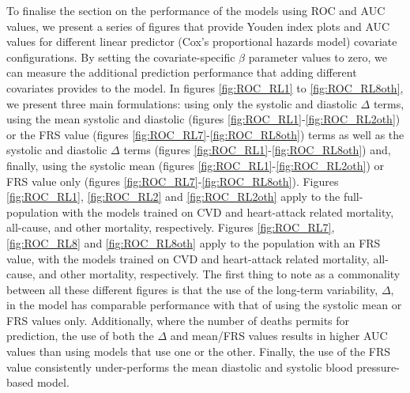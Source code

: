 \documentclass[
]{article}
\begin{document}
To finalise the section on the performance of the models using ROC and AUC values, we present a series of figures that provide Youden index plots and AUC values for different linear predictor (Cox's proportional hazards model) covariate configurations. By setting the covariate-specific \(\beta\) parameter values to zero, we can measure the additional prediction performance that adding different covariates provides to the model. In figures \ref{fig:ROC_RL1} to \ref{fig:ROC_RL8oth}, we present three main formulations: using only the systolic and diastolic \(\Delta\) terms, using the mean systolic and diastolic (figures \ref{fig:ROC_RL1}-\ref{fig:ROC_RL2oth}) or the FRS value (figures \ref{fig:ROC_RL7}-\ref{fig:ROC_RL8oth}) terms as well as the systolic and diastolic \(\Delta\) terms (figures \ref{fig:ROC_RL1}-\ref{fig:ROC_RL8oth}) and, finally, using the systolic mean (figures \ref{fig:ROC_RL1}-\ref{fig:ROC_RL2oth}) or FRS value only (figures \ref{fig:ROC_RL7}-\ref{fig:ROC_RL8oth}). Figures \ref{fig:ROC_RL1}, \ref{fig:ROC_RL2} and \ref{fig:ROC_RL2oth} apply to the full-population with the models trained on CVD and heart-attack related mortality, all-cause, and other mortality, respectively. Figures \ref{fig:ROC_RL7}, \ref{fig:ROC_RL8} and \ref{fig:ROC_RL8oth} apply to the population with an FRS value, with the models trained on CVD and heart-attack related mortality, all-cause, and other mortality, respectively. The first thing to note as a commonality between all these different figures is that the use of the long-term variability, \(\Delta\), in the model has comparable performance with that of using the systolic mean or FRS values only. Additionally, where the number of deaths permits for prediction, the use of both the \(\Delta\) and mean/FRS values results in higher AUC values than using models that use one or the other. Finally, the use of the FRS value consistently under-performs the mean diastolic and systolic blood pressure-based model.
\end{document}
